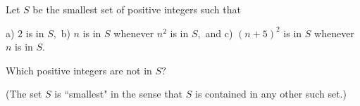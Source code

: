 Let $S$ be the smallest set of positive integers such that

a) $2$ is in $S,$
b) $n$ is in $S$ whenever $n^2$ is in $S,$ and
c) $(n+5)^2$ is in $S$ whenever $n$ is in $S.$

Which positive integers are not in $S?$

(The set $S$ is ``smallest" in the sense that $S$ is contained in any other such set.)